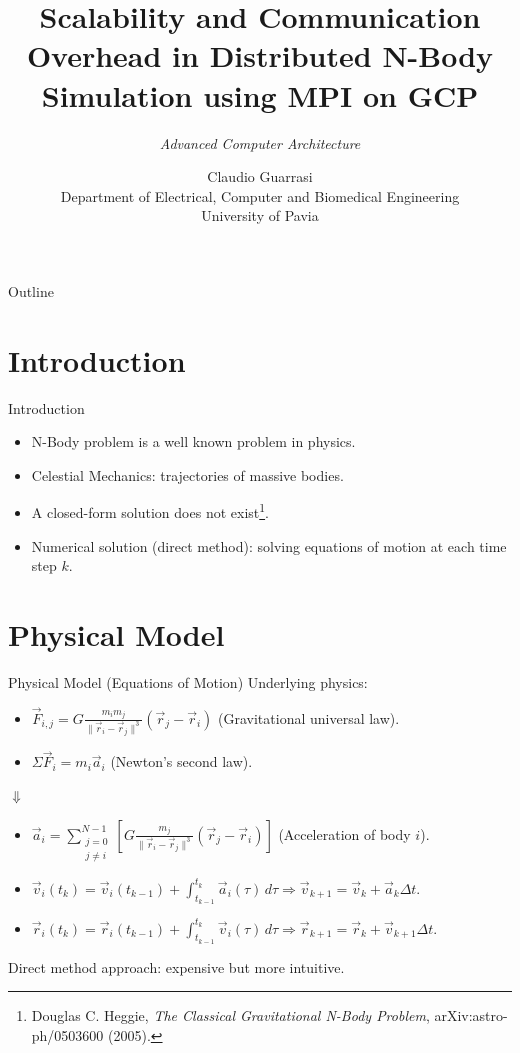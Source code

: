 \documentclass{beamer}
\title{Scalability and Communication Overhead in Distributed N-Body Simulation using MPI on GCP}
\subtitle{\textit{Advanced Computer Architecture}}
\author{Claudio Guarrasi \\ \small{Department of Electrical, Computer and Biomedical Engineering} \\ \small{University of Pavia}}
\institute{}
\date{}
\begin{document}
\maketitle

\begin{frame}{Outline}
  \tableofcontents
\end{frame}

\section{Introduction}
\begin{frame}{Introduction}
\begin{itemize}
	\item N-Body problem is a well known problem in physics.
	\item Celestial Mechanics: trajectories of massive bodies.
	\item A closed-form solution does not exist\footnote{Douglas C. Heggie, \emph{The Classical Gravitational N-Body Problem}, arXiv:astro-ph/0503600 (2005).}.
	\item Numerical solution (direct method): solving equations of motion at each time step $k$.	
\end{itemize}
\end{frame}

\section{Physical Model}
\begin{frame}{Physical Model (Equations of Motion)}
Underlying physics:
\begin{itemize}
	\item $\vec{F}_{i,j}=G\frac{m_{i} m_{j}}{\|\vec{r}_{i}-\vec{r}_{j}\|^3}(\vec{r}_{j}-\vec{r}_{i})$ (Gravitational universal law).
	\item $\Sigma\vec{F}_i = m_i\vec{a}_i$ (Newton's second law).
\end{itemize}
\begin{center}
	$\Downarrow$
\end{center}
\begin{itemize}
	\item $\vec{a}_i=\sum_{\substack{j=0 \\ j \neq i}}^{N-1}\left[G\frac{m_j}{\|\vec{r}_i-\vec{r}_j\|^3}(\vec{r}_j-\vec{r}_i)\right]$ (Acceleration of body $i$).
	\item $\vec{v}_i(t_k) = \vec{v}_i(t_{k-1}) + \int_{t_{k-1}}^{t_k} \vec{a}_i(\tau)\, d\tau \Rightarrow \vec{v}_{k+1}=\vec{v}_k+\vec{a}_k\Delta t$.
	\item $\vec{r}_i(t_k) = \vec{r}_i(t_{k-1}) + \int_{t_{k-1}}^{t_k} \vec{v}_i(\tau)\, d\tau \Rightarrow \vec{r}_{k+1}=\vec{r}_k+\vec{v}_{k+1}\Delta t$.
\end{itemize}
Direct method approach: expensive but more intuitive.
\end{frame}
\end{document}
